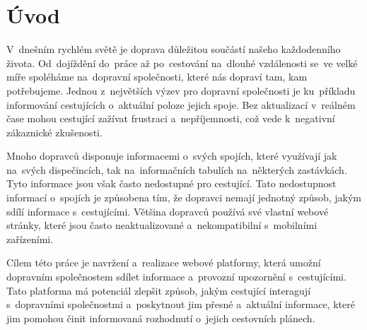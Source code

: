 \chapter{Úvod}
V~dnešním rychlém světě je doprava důležitou součástí našeho každodenního života. Od~dojíždění do~práce až po~cestování na~dlouhé vzdálenosti se~ve velké míře spoléháme na~dopravní společnosti, které nás dopraví tam, kam potřebujeme. Jednou z~největších výzev pro dopravní společnosti je ku~příkladu informování cestujících o~aktuální poloze jejich spoje. Bez aktualizací v~reálném čase mohou cestující zažívat frustraci a~nepříjemnosti, což vede k~negativní zákaznické zkušenosti.\par
Mnoho dopravců disponuje informacemi o~svých spojích, které využívají jak na~svých dispečincích, tak na~informačních tabulích na~některých zastávkách. Tyto informace jsou však často nedostupné pro cestující. Tato nedostupnost informací o~spojích je způsobena tím, že dopravci nemají jednotný způsob, jakým sdílí informace s~cestujícími. Většina dopravců používá své vlastní webové stránky, které jsou často neaktualizované a~nekompatibilní s~mobilními zařízeními.\par
Cílem této práce je navržení a~realizace webové platformy, která umožní dopravním společnostem sdílet informace a~provozní upozornění s~cestujícími. Tato platforma má potenciál zlepšit způsob, jakým cestující interagují s~dopravními společnostmi a~poskytnout jim přesné a~aktuální informace, které jim pomohou činit informovaná rozhodnutí o~jejich cestovních plánech.